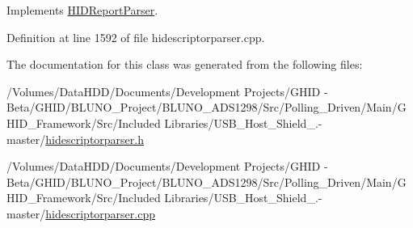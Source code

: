 \-Implements \hyperlink{class_h_i_d_report_parser_ad2837f3d78c7ac3f1c2b3a4815420d97}{\-H\-I\-D\-Report\-Parser}.



\-Definition at line 1592 of file hidescriptorparser.\-cpp.



\-The documentation for this class was generated from the following files\-:\begin{DoxyCompactItemize}
\item 
/\-Volumes/\-Data\-H\-D\-D/\-Documents/\-Development Projects/\-G\-H\-I\-D -\/ Beta/\-G\-H\-I\-D/\-B\-L\-U\-N\-O\-\_\-\-Project/\-B\-L\-U\-N\-O\-\_\-\-A\-D\-S1298/\-Src/\-Polling\-\_\-\-Driven/\-Main/\-G\-H\-I\-D\-\_\-\-Framework/\-Src/\-Included Libraries/\-U\-S\-B\-\_\-\-Host\-\_\-\-Shield\-\_.-\/master/\hyperlink{hidescriptorparser_8h}{hidescriptorparser.\-h}\item 
/\-Volumes/\-Data\-H\-D\-D/\-Documents/\-Development Projects/\-G\-H\-I\-D -\/ Beta/\-G\-H\-I\-D/\-B\-L\-U\-N\-O\-\_\-\-Project/\-B\-L\-U\-N\-O\-\_\-\-A\-D\-S1298/\-Src/\-Polling\-\_\-\-Driven/\-Main/\-G\-H\-I\-D\-\_\-\-Framework/\-Src/\-Included Libraries/\-U\-S\-B\-\_\-\-Host\-\_\-\-Shield\-\_.-\/master/\hyperlink{hidescriptorparser_8cpp}{hidescriptorparser.\-cpp}\end{DoxyCompactItemize}

